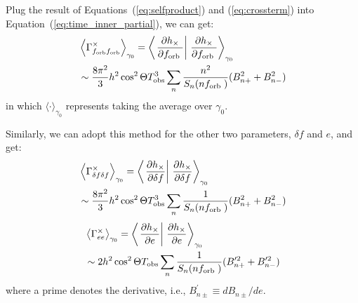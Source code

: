 \documentclass[%
 reprint,
 amsmath,amssymb,
 aps,
]{revtex4-2}
\begin{document}
Plug the result of Equations~(\ref{eq:selfproduct}) and (\ref{eq:crossterm}) into Equation~(\ref{eq:time_inner_partial}), we can get:
\begin{align}\label{eq:gammaforbcorss}
&\left\langle\Gamma^{\times}_{{f_{\rm orb}f_{\rm orb}}} \right\rangle_{\gamma_0} =\left\langle\left.\frac{\partial h_\times}{\partial f_{\text {orb }}} \right\rvert\, \frac{\partial h_\times}{\partial f_{\text {orb }}}\right\rangle_{\gamma_0}  \nonumber\\ &\sim \frac{8\pi^2}{3} h^2 \cos ^2 \Theta  T_{\rm obs}^3  \sum_n \frac{n^2}{S_n(nf_{\text {orb }})} ( B_{n+}^2 + B_{n-}^2) 
\end{align}
in which $\langle\cdot\rangle_{\gamma_0}$ represents taking the average over $\gamma_0$.

Similarly, we can adopt this method for the other two parameters, $\delta f$ and $e$, and get: 
\begin{align}
&\left\langle\Gamma^{\times}_{\delta f \delta f} \right\rangle_{\gamma_0} =\left\langle\left.\frac{\partial h_\times}{\partial \delta f} \right\rvert\, \frac{\partial h_\times}{\partial \delta f}\right\rangle_{\gamma_0} \nonumber\\ &\sim \frac{8\pi^2}{3} h^2 \cos ^2 \Theta  T_{\rm obs}^3  \sum_n \frac{1}{S_n(nf_{\text {orb }})} ( B_{n+}^2 + B_{n-}^2) 
\end{align}
\begin{align}
&\left\langle\Gamma^{\times}_{ee}\right\rangle_{\gamma_0} =  \left\langle\left.\frac{\partial h_\times}{\partial e} \right\rvert\, \frac{\partial h_\times}{\partial e}\right\rangle_{\gamma_0} \nonumber\\ &\sim  2h^2 \cos ^2 \Theta  T_{\rm obs}  \sum_n \frac{1}{S_n(nf_{\text {orb }})} ( B_{n+}^{\prime 2} + B_{n-}^{\prime 2}) 
\end{align}
where a prime denotes the derivative, i.e., $B_{n\pm}^{\prime} \equiv dB_{n\pm}/de$. 
\end{document}
